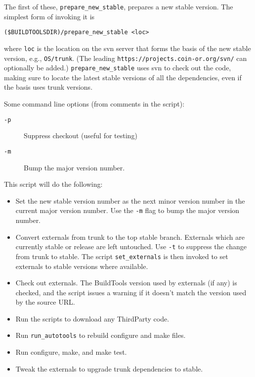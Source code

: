 \medskip

The first of these, {\tt prepare\_new\_stable}, prepares a new stable version. The simplest form of invoking it is

\begin{verbatim}
($BUILDTOOLSDIR)/prepare_new_stable <loc>
\end{verbatim}

where {\tt loc} is the location on the svn server that forms the basis of the new stable version, e.g., {\tt OS/trunk}. (The leading {\tt https://projects.coin-or.org/svn/} can optionally be added.)
{\tt prepare\_new\_stable} uses svn to check out the code, making sure to locate the latest stable versions of all the dependencies, even if the basis uses trunk versions.

Some command line options (from comments in the script):

\begin{description}
  \item[\tt -p]			Suppress checkout (useful for testing)
  \item[\tt -m] 		Bump the major version number.
\end{description}

This script will do the following:

\begin{itemize}
  \item Set the new stable version number as the next minor version number in
    the current major version number. Use the {\tt -m} flag to bump the major
    version number.

  \item Convert externals from trunk to the top stable branch. Externals which
    are currently stable or release are left untouched. Use {\tt -t} to suppress
    the change from trunk to stable. The script {\tt set\_externals} is then invoked to set
    externals to stable versions where available.

  \item Check out externals. The BuildTools version used by externals (if any)
    is checked, and the script issues a warning if it doesn't match the
    version used by the source URL.

 \item Run the scripts to download any ThirdParty code.

  \item Run {\tt run\_autotools} to rebuild configure and make files.

  \item Run configure, make, and make test.

  \item Tweak the externals to upgrade trunk  dependencies to stable.
\end{itemize}

